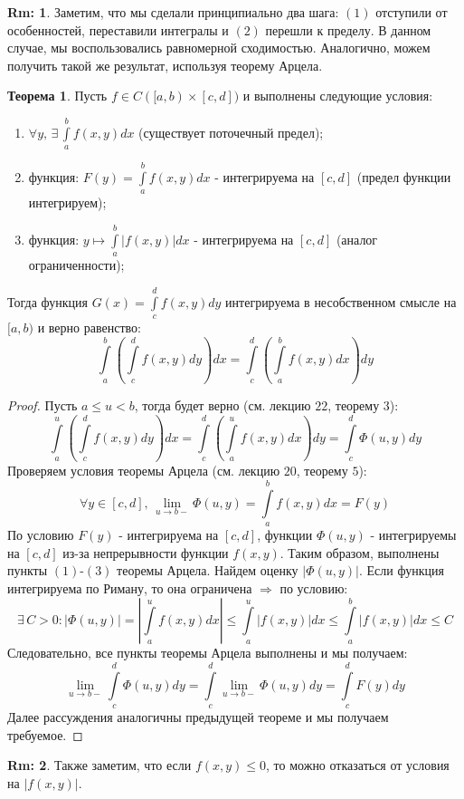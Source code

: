 \documentclass[12pt]{article}
\theoremstyle{definition}
\newtheorem{rem}{Rm:}
\newtheorem{theorem}{Теорема}
\newcommand{\ddint}[2]{\displaystyle\int\limits_{#1}^{#2}}
\begin{document}
\begin{rem}
	Заметим, что мы сделали принципиально два шага: $(1)$ отступили от особенностей, переставили интегралы и $(2)$ перешли к пределу. В данном случае, мы воспользовались равномерной сходимостью. Аналогично, можем получить такой же результат, используя теорему Арцела.
\end{rem}
\begin{theorem}
	Пусть $f \in C([a,b)\times[c,d])$ и выполнены следующие условия:
	\begin{enumerate}[label=(\arabic*)]
		\item $\forall y, \, \exists \, \ddint{a}{b}f(x,y)dx$ (существует поточечный предел);
		\item функция: $F(y) = \ddint{a}{b}f(x,y)dx$ - интегрируема на $[c,d]$ (предел функции интегрируем);
		\item функция: $y \mapsto \ddint{a}{b}|f(x,y)|dx$ - интегрируема на $[c,d]$ (аналог ограниченности);
	\end{enumerate}  
	Тогда функция $G(x) = \ddint{c}{d}f(x,y)dy$ интегрируема в несобственном смысле на $[a,b)$ и верно равенство:
	$$
		\ddint{a}{b}\left(\ddint{c}{d}f(x,y)dy\right)dx = \ddint{c}{d}\left(\ddint{a}{b}f(x,y)dx\right)dy
	$$
\end{theorem}
\begin{proof}
	Пусть $a \leq u < b$, тогда будет верно (см. лекцию $22$, теорему $3$):
	$$
		\ddint{a}{u}\left(\ddint{c}{d}f(x,y)dy\right)dx = \ddint{c}{d}\left(\ddint{a}{u}f(x,y)dx\right)dy = \ddint{c}{d}\Phi(u,y)dy
	$$
	Проверяем условия теоремы Арцела (см. лекцию $20$, теорему $5$):
	$$
		\forall y \in [c,d], \, \lim\limits_{u \to b-}\Phi(u,y) = \ddint{a}{b}f(x,y)dx = F(y)
	$$
	По условию $F(y)$ - интегрируема на $[c,d]$, функции $\Phi(u,y)$ - интегрируемы на $[c,d]$ из-за непрерывности функции $f(x,y)$. Таким образом, выполнены пункты $(1)$-$(3)$ теоремы Арцела. Найдем оценку $|\Phi(u,y)|$. Если функция интегрируема по Риману, то она ограничена $\Rightarrow$ по условию:
	$$
		\exists \, C > 0\colon	\left|\Phi(u,y)\right| = \left|\ddint{a}{u}f(x,y)dx\right| \leq \ddint{a}{u}|f(x,y)|dx \leq \ddint{a}{b}|f(x,y)|dx \leq C
	$$
	Следовательно, все пункты теоремы Арцела выполнены и мы получаем:
	$$
		\lim\limits_{u \to b-}\ddint{c}{d}\Phi(u,y)dy = \ddint{c}{d}\lim\limits_{u \to b-}\Phi(u,y)dy = \ddint{c}{d}F(y)dy
	$$
	Далее рассуждения аналогичны предыдущей теореме и мы получаем требуемое.
\end{proof}
\begin{rem}
	Также заметим, что если $f(x,y) \leq 0$, то можно отказаться от условия на $|f(x,y)|$.
\end{rem}
\end{document}
